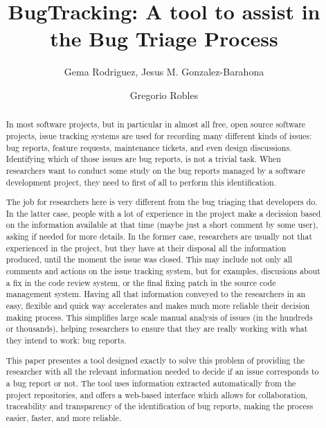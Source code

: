 \documentclass[ifip]{svmult}
\begin{document}
\title*{BugTracking: A tool to assist in the Bug Triage Process}
\author{Gema Rodriguez, Jesus M. Gonzalez-Barahona \and Gregorio Robles}
%
%
\maketitle

\begin{abstract}
	In most software projects, but in particular in almost all free, open source software projects, issue tracking systems are used for recording many different kinds of issues: bug reports, feature requests, maintenance tickets, and even design discussions. Identifying which of those issues are bug reports, is not a trivial task. When researchers want to conduct some study on the bug reports managed by a software development project, they need to first of all to perform this identification.

	The job for researchers here is very different from the bug triaging that developers do. In the latter case, people with a lot of experience in the project make a decission based on the information available at that time (maybe just a short comment by some user), asking if needed for more details. In the former case, researchers are usually not that experienced in the project, but they have at their disposal all the information produced, until the moment the issue was closed. This may include not only all comments and actions on the issue tracking system, but for examples, discusions about a fix in the code review system, or the final fixing patch in the source code management system. Having all that information conveyed to the researchers in an easy, flexible and quick way accelerates and makes much more reliable their decision making process. This simplifies large scale manual analysis of issues (in the hundreds or thousands), helping researchers to ensure that they are really working with what they intend to work: bug reports.

	This paper presentes a tool designed exactly to solve this problem of providing the researcher with all the relevant information needed to decide if an issue corresponds to a bug report or not. The tool uses information extracted automatically from the project repositories, and offers a web-based interface which allows for collaboration, traceability and transparency of the identification of bug reports, making the process easier, faster, and more reliable.
\end{abstract}
\end{document}
